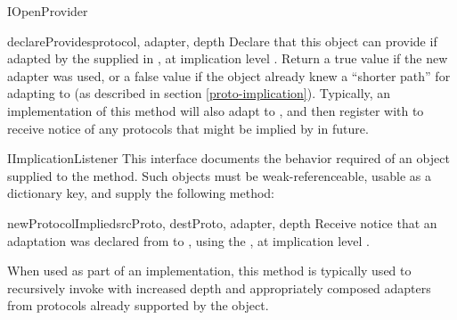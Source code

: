 \begin{verbatim%
}
\begin{verbatim%
}
\begin{verbatim%
}
\begin{verbatim%
}
\begin{verbatim%
}
\begin{verbatim%
}
\begin{classdesc*}{IOpenProvider}
\begin{methoddesc}{declareProvides}{protocol, adapter, depth}
Declare that this object can provide  if adapted by the
 supplied in , at implication level
.  Return a true value if the new adapter was used, or a false
value if the object already knew a ``shorter path'' for adapting to
 (as described in section \ref{proto-implication}).  Typically,
an implementation of this method will also adapt  to
, and then register with 
to receive notice of any protocols that might be implied by 
in future.
\end{methoddesc}

\end{classdesc*}

















\begin{classdesc*}{IImplicationListener}
This interface documents the behavior required of an object supplied to
the  method.  Such objects must
be weak-referenceable, usable as a dictionary key, and supply the following
method:

\begin{methoddesc}{newProtocolImplied}{srcProto, destProto, adapter, depth}
Receive notice that an adaptation was declared from  to
, using the  , at
implication level .

When used as part of an  implementation, this method is
typically used to recursively invoke  with
increased depth and appropriately composed adapters from protocols already
supported by the object.
\end{methoddesc}

\end{classdesc*}
























\end{verbatim%
}
\end{verbatim%
}
\end{verbatim%
}
\end{verbatim%
}
\end{verbatim%
}
\end{verbatim%
}
